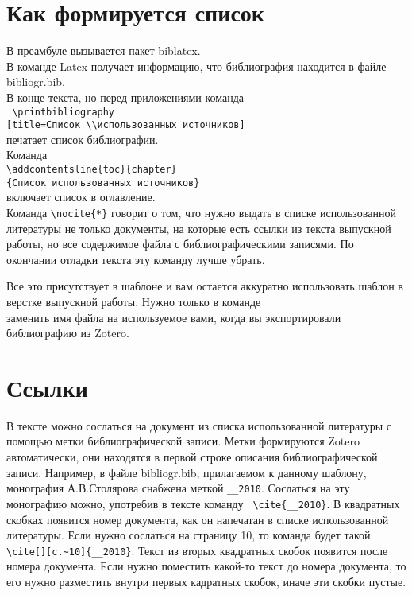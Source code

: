\section{Как формируется список}

В преамбуле вызывается пакет biblatex.\\
В команде \verb||  Latex получает информацию, что библиография находится в файле bibliogr.bib.\\
В конце текста, но перед приложениями команда\\
\verb| \printbibliography|\\
\verb|[title=Список \\использованных источников]|\\
печатает список библиографии.\\
Команда\\
\verb|\addcontentsline{toc}{chapter}|\\
\verb|{Список использованных источников}|\\
включает список в оглавление.\\
Команда \verb|\nocite{*}| говорит о том, что нужно выдать в списке использованной литературы не только документы, на которые есть ссылки из текста выпускной работы, но все содержимое файла с библиографическими записями. По окончании отладки текста эту команду лучше убрать.


Все это присутствует в шаблоне и вам остается аккуратно использовать шаблон в верстке выпускной работы. Нужно только в команде\\  
\verb|| заменить имя файла на используемое вами, когда вы экспортировали библиографию из Zotero.

\section{Ссылки}

В тексте можно сослаться на документ из списка использованной литературы с помощью метки библиографической записи. Метки формируются Zotero автоматически, они находятся в первой строке описания библиографической записи. Например, в файле bibliogr.bib, прилагаемом к данному шаблону, монография А.В.Столярова снабжена меткой \verb|__2010|. Сослаться на эту монографию можно, употребив в тексте команду \verb| \cite{__2010}|. В квадратных скобках появится номер документа, как он напечатан в списке использованной литературы. Если нужно сослаться на страницу 10, то команда будет такой: \verb|\cite[][с.~10]{__2010}|. Текст из вторых квадратных скобок появится после номера документа. Если нужно поместить какой-то текст до номера документа, то его нужно разместить  внутри первых кадратных скобок, иначе эти скобки пустые.

